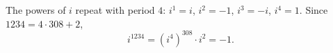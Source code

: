 The powers of $i$ repeat with period $4$: $i^1=i$, $i^2=-1$, $i^3=-i$, $i^4=1$. Since $1234=4\cdot308+2$,
\[i^{1234}=\left(i^4\right)^{308}\cdot i^2=\boxed{-1}.\]
